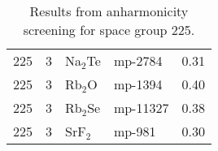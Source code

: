 \begin{table*}[t]
\begin{center}
\begin{tabular}{rrllr}
         225 &            3 &     Na$_2$Te &    mp-2784 &       0.31 \\
         225 &            3 &      Rb$_2$O &    mp-1394 &       0.40 \\
         225 &            3 &     Rb$_2$Se &   mp-11327 &       0.38 \\
         225 &            3 &      SrF$_2$ &     mp-981 &       0.30 \\
\bottomrule
\end{tabular}
\end{center}
   \caption{Results from anharmonicity screening for space group 225.}
   \label{tab:screening.sigma.3}
 \end{table*}